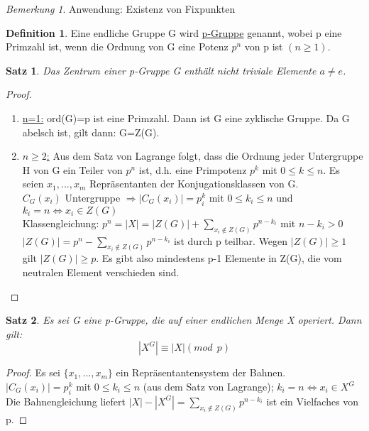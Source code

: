 \documentclass[12pt]{scrartcl}%
\newtheorem{thm}{Satz}
\theoremstyle{definition}
\newtheorem*{defn}{Definition}
\theoremstyle{remark}
\newtheorem*{nb}{Bemerkung}
\begin{document}
\begin{nb}
Anwendung: Existenz von Fixpunkten
\end{nb}

\begin{defn} 
Eine endliche Gruppe G wird \underline{p-Gruppe} genannt, wobei p eine Primzahl ist, wenn die Ordnung von G eine Potenz $p^n$ von p ist $(n\geq 1)$.
\end{defn}

\begin{thm}
Das Zentrum einer p-Gruppe G enthält nicht triviale Elemente $a \neq e$.
\end{thm}

\begin{proof}
\begin{enumerate}
\item \underline{n=1:} ord(G)=p ist eine Primzahl. Dann ist G eine zyklische Gruppe. Da G abelsch ist, gilt dann: G=Z(G).
\item \underline{$n\geq 2$:} Aus dem Satz von Lagrange folgt, dass die Ordnung jeder Untergruppe H von G ein Teiler von $p^n$ ist, d.h. eine Primpotenz $p^k$ mit $0\leq k\leq n$. Es seien $x_{1},...,x_{m}$ Repräsentanten der Konjugationsklassen von G. \\
$C_{G}(x_{i})$ Untergruppe $\Rightarrow |C_{G}(x_{i})|=p^k_{i}$ mit $0\leq k_{i} \leq n$ und $k_{i}=n \Leftrightarrow x_{i} \in Z(G)$  \\
Klassengleichung: $p^n=|X|=|Z(G)|+\sum_{x_{i}\notin Z(G)}p^{n-k_{i}}$ mit $n-k_{i}>0$ \\
$|Z(G)|= p^n-\sum_{x_{i}\notin Z(G)}p^{n-k_{i}}$ ist durch p teilbar. Wegen $|Z(G)|\geq 1$ gilt $|Z(G)|\geq p$. Es gibt also mindestens p-1 Elemente in Z(G), die vom neutralen Element verschieden sind.
\end{enumerate}
\end{proof}

\begin{thm}
Es sei G eine p-Gruppe, die auf einer endlichen Menge X operiert. Dann gilt:
\begin{equation*}
|X^G|\equiv |X|(mod\ \ p)
\end{equation*}
\end{thm}

\begin{proof}
Es sei $\{x_{1},...,x_{m}\}$ ein Repräsentantensystem der Bahnen. \\
$|C_{G}(x_{i})|=p^k_{i}$ mit $0\leq k_{i} \leq n$ (aus dem Satz von Lagrange); $k_{i}=n\Leftrightarrow x_{i} \in X^G$ \\
Die Bahnengleichung liefert $|X|-|X^G|=\sum_{x_{i}\notin Z(G)}p^{n-k_{i}}$ ist ein Vielfaches von p.
\end{proof}
\end{document}
